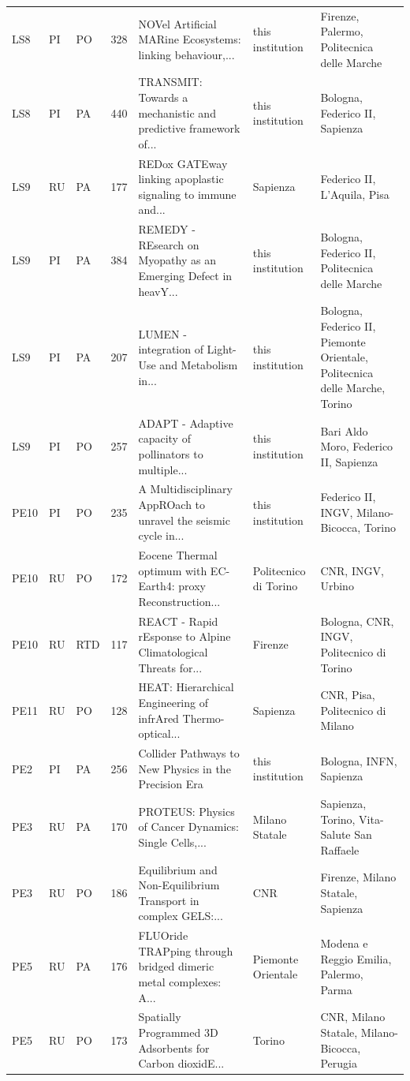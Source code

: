 \documentclass[11pt,a4paper]{article}
\begin{document}
{\begin{longtable}{lllrp{4.2cm}p{2cm}p{3.2cm}}
LS8 & PI & PO & 328 & NOVel Artificial MARine Ecosystems: linking behaviour,... & this institution & Firenze, Palermo, Politecnica delle Marche \\
LS8 & PI & PA & 440 & TRANSMIT: Towards a mechanistic and predictive framework of... & this institution & Bologna, Federico II, Sapienza \\
LS9 & RU & PA & 177 & REDox GATEway linking apoplastic signaling to immune and... & Sapienza & Federico II, L'Aquila, Pisa \\
LS9 & PI & PA & 384 & REMEDY - REsearch on Myopathy as an Emerging Defect in heavY... & this institution & Bologna, Federico II, Politecnica delle Marche \\
LS9 & PI & PA & 207 & LUMEN - integration of Light-Use and Metabolism in... & this institution & Bologna, Federico II, Piemonte Orientale, Politecnica delle Marche, Torino \\
LS9 & PI & PO & 257 & ADAPT - Adaptive capacity of pollinators to multiple... & this institution & Bari Aldo Moro, Federico II, Sapienza \\
PE10 & PI & PO & 235 & A Multidisciplinary AppROach to unravel the seismic cycle in... & this institution & Federico II, INGV, Milano-Bicocca, Torino \\
PE10 & RU & PO & 172 & Eocene Thermal optimum with EC-Earth4: proxy Reconstruction... & Politecnico di Torino & CNR, INGV, Urbino \\
PE10 & RU & RTD & 117 & REACT - Rapid rEsponse to Alpine Climatological Threats for... & Firenze & Bologna, CNR, INGV, Politecnico di Torino \\
PE11 & RU & PO & 128 & HEAT: Hierarchical Engineering of infrAred Thermo-optical... & Sapienza & CNR, Pisa, Politecnico di Milano \\
PE2 & PI & PA & 256 & Collider Pathways to New Physics in the Precision Era & this institution & Bologna, INFN, Sapienza \\
PE3 & RU & PA & 170 & PROTEUS: Physics of Cancer Dynamics: Single Cells,... & Milano Statale & Sapienza, Torino, Vita-Salute San Raffaele \\
PE3 & RU & PO & 186 & Equilibrium and Non-Equilibrium Transport in complex GELS:... & CNR & Firenze, Milano Statale, Sapienza \\
PE5 & RU & PA & 176 & FLUOride TRAPping through bridged dimeric metal complexes: A... & Piemonte Orientale & Modena e Reggio Emilia, Palermo, Parma \\
PE5 & RU & PO & 173 & Spatially Programmed 3D Adsorbents for Carbon dioxidE... & Torino & CNR, Milano Statale, Milano-Bicocca, Perugia \\

\end{longtable}}
\end{document}
